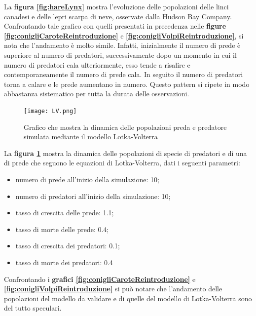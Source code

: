 \documentclass[11pt]{article}
\begin{document}
La \textbf{figura \ref{fig:hareLynx}} mostra l'evoluzione delle popolazioni delle linci canadesi e delle lepri scarpa di neve, osservate dalla Hudson Bay Company\cite{HareLynx}. Confrontando tale grafico con quelli presentati in precedenza nelle\textbf{ figure \ref{fig:conigliCaroteReintroduzione}} e \textbf{\ref{fig:conigliVolpiReintroduzione}}, si nota che l'andamento è molto simile. Infatti, inizialmente il numero di prede è superiore al numero di predatori, successivamente dopo un momento in cui il numero di predatori cala ulteriormente, esso  tende a risalire e contemporaneamente il numero di prede cala. In seguito il numero di predatori torna a calare e le prede aumentano in numero. Questo pattern si ripete in modo abbastanza sistematico per tutta la durata delle osservazioni. 

\begin{figure}[h!]
     \centering
     \texttt{[image: LV.png]}
     \caption{Grafico che mostra la dinamica delle popolazioni preda e predatore simulata mediante il modello Lotka-Volterra}
     \label{fig:LVValidazione}
\end{figure}

La \textbf{figura \ref{fig:LVValidazione}} mostra la dinamica delle popolazioni di specie di predatori e di una di prede che seguono le equazioni di Lotka-Volterra, dati i seguenti parametri: 
\begin{itemize}
	\item numero di prede all'inizio della simulazione: 10;
	\item numero di predatori all'inizio della simulazione: 10;
	\item tasso di crescita delle prede: 1.1;
	\item tasso di morte delle prede: 0.4;
	\item tasso di crescita dei predatori: 0.1;
	\item tasso di morte dei predatori: 0.4
\end{itemize}
Confrontando i \textbf{grafici \ref{fig:conigliCaroteReintroduzione}} e \textbf{\ref{fig:conigliVolpiReintroduzione}} si può notare che l'andamento delle popolazioni del modello da validare e di quelle del modello di Lotka-Volterra sono del tutto speculari. 
\end{document}
